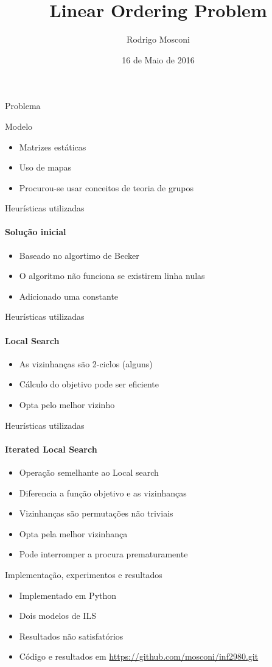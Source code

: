 \documentclass{beamer}
\author{Rodrigo Mosconi}
\title{Linear Ordering Problem}
\date{16 de Maio de 2016}
\begin{document}
\maketitle

\begin{frame}{Problema}
\end{frame}

\begin{frame}{Modelo}
\begin{itemize}
\item Matrizes estáticas
\item Uso de mapas 
\item Procurou-se usar conceitos de teoria de grupos
\end{itemize}
\end{frame}

\begin{frame}{Heurísticas utilizadas}
\framesubtitle{Solução inicial}
\begin{itemize}
\item Baseado no algortimo de Becker
\item O algoritmo não funciona se existirem linha nulas
\item Adicionado uma constante
\end{itemize}
\end{frame}

\begin{frame}{Heurísticas utilizadas}
\framesubtitle{Local Search}
\begin{itemize}
\item As vizinhanças são 2-ciclos (alguns)
\item Cálculo do objetivo pode ser eficiente
\item Opta pelo melhor vizinho
\end{itemize}
\end{frame}

\begin{frame}{Heurísticas utilizadas}
\framesubtitle{Iterated Local Search}
\begin{itemize}
\item Operação semelhante ao Local search
\item Diferencia a função objetivo e as vizinhanças
\item Vizinhanças são permutações não triviais
\item Opta pela melhor vizinhança
\item Pode interromper a procura prematuramente
\end{itemize}
\end{frame}

\begin{frame}{Implementação, experimentos e resultados}
\begin{itemize}
\item Implementado em Python
\item Dois modelos de ILS
\item Resultados não satisfatórios
\item Código e resultados em \url{https://github.com/mosconi/inf2980.git}
\end{itemize}
\end{frame}
\end{document}
